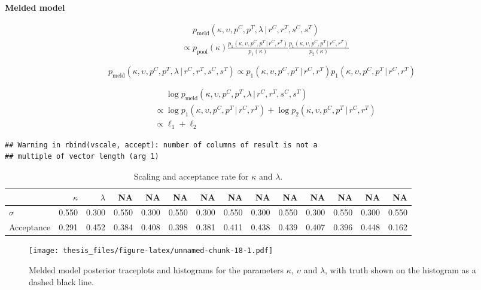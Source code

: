 \documentclass[11pt,]{book}
\begin{document}
\newpage

\textbf{Melded model}

\begin{align}
&\phantom{\propto} p_{\text{meld}}(\kappa, \upsilon, p^C, p^T, \lambda \, | \, r^C, r^T, s^C, s^T) \nonumber \\
&\propto p_{\text{pool}}(\kappa) \frac{p_1(\kappa, \upsilon, p^C, p^T \, | \, r^C, r^T)}{p_1(\kappa)} \frac{p_1(\kappa, \upsilon, p^C, p^T \, | \, r^C, r^T)}{p_2(\kappa)}
\end{align}

\begin{equation}
p_{\text{meld}}(\kappa, \upsilon, p^C, p^T, \lambda \, | \, r^C, r^T, s^C, s^T)
\propto p_1(\kappa, \upsilon, p^C, p^T \, | \, r^C, r^T) p_1(\kappa, \upsilon, p^C, p^T \, | \, r^C, r^T)
\end{equation}

\begin{align}
&\phantom{\propto} \log p_{\text{meld}}(\kappa, \upsilon, p^C, p^T, \lambda \, | \, r^C, r^T, s^C, s^T) \nonumber \\
&\propto \log p_1(\kappa, \upsilon, p^C, p^T \, | \, r^C, r^T) + \log p_2(\kappa, \upsilon, p^C, p^T \, | \, r^C, r^T) \nonumber \\
&\propto \ell_1 + \ell_2
\end{align}

\begin{verbatim}
## Warning in rbind(vscale, accept): number of columns of result is not a
## multiple of vector length (arg 1)
\end{verbatim}

\begin{table}[!h]

\caption{\label{tab:unnamed-chunk-17}Scaling and acceptance rate for $\kappa$ and $\lambda$.}
\centering
\begin{tabular}{lrrrrrrrrrrrrr}
\toprule
  & $\kappa$ & $\lambda$ & NA & NA & NA & NA & NA & NA & NA & NA & NA & NA & NA\\
\midrule
$\sigma$ & 0.550 & 0.300 & 0.550 & 0.300 & 0.550 & 0.300 & 0.550 & 0.300 & 0.550 & 0.300 & 0.550 & 0.300 & 0.550\\
Acceptance & 0.291 & 0.452 & 0.384 & 0.408 & 0.398 & 0.381 & 0.411 & 0.438 & 0.439 & 0.407 & 0.396 & 0.448 & 0.162\\
\bottomrule
\end{tabular}
\end{table}

\begin{figure}
\centering
\texttt{[image: thesis\_files/figure-latex/unnamed-chunk-18-1.pdf]}
\caption{\label{fig:unnamed-chunk-18}Melded model posterior traceplots and
histograms for the parameters \(\kappa\), \(\upsilon\) and \(\lambda\),
with truth shown on the histogram as a dashed black line.}
\end{figure}
\end{document}
